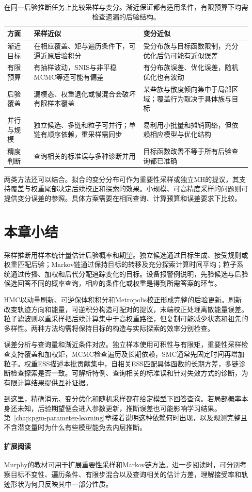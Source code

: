 \begin{table}[htbp]
  \centering
  \begin{tabularx}{\linewidth}{@{}lXX@{}}
    \toprule
    方面 & 采样近似 & 变分近似\\
    \midrule
    渐近目标 & 在相应覆盖、矩与遍历条件下，可逼近原后验积分 & 受分布族与目标函数限制，充分优化后仍可能有近似误差\\
    有限预算 & 有抽样波动，SNIS与非平稳MCMC等还可能有偏差 & 有分布族误差、优化误差，随机优化也有波动\\
    后验覆盖 & 漏模态、权重退化或慢混合会破坏有限样本覆盖 & 某些族与散度倾向集中于局部区域；覆盖行为取决于具体族与目标\\
    并行与规模 & 独立候选、多链和粒子可并行；单链有顺序依赖，重采样需同步 & 易利用小批量和摊销网络，但依赖相应模型与优化结构\\
    精度判断 & 查询相关的标准误与多种诊断并用 & 目标函数改善不等于所有后验查询都已准确\\
    \bottomrule
  \end{tabularx}
  \caption{在同一后验推断任务上比较采样与变分。渐近保证都有适用条件，有限预算下均需检查遗漏的后验结构。}
  \label{tab:pgm-sampling-vi-comparison}
\end{table}

两类方法还可以结合。拟合的变分分布可作为重要性采样或独立MH的提议，其支持覆盖与权重尾部决定后续校正和探索的效果。小规模、可高精度采样的问题则可提供变分误差的参照。具体方案需要在相同查询、计算预算和误差要求下比较。

\section{本章小结}
\label{sec:pgm-sampling-summary}

采样推断用样本统计量估计后验概率和期望。独立候选通过目标生成、接受规则或权重匹配后验；Markov链通过保持目标的转移及充分探索计算时间平均；粒子系统通过传播、加权和后代分配追踪变化的目标。设备报警例说明，先验候选与后验候选回答不同的概率查询，相应的条件化或权重是得到所需答案的环节。

HMC以动量刷新、可逆保体积积分和Metropolis校正形成完整的后验更新。刷新改变轨迹方向和能量，可逆积分构造可配对的提议，末端校正处理离散能量误差。粒子滤波则以重采样把后续计算集中于高权重路径，但复制可能减少状态和祖先的多样性。两种方法均需将保持目标的构造与实际探索的效率分别检查。

误差分析与查询量和渐近条件对应。独立样本使用可积性与有限矩，重要性采样检查支持覆盖和加权矩，MCMC检查遍历及长期依赖，SMC通常先固定时间再增加粒子。权重ESS描述本批贡献集中，自相关ESS匹配具体函数的长期方差，多链诊断检查探索是否一致。可解析特例、查询相关的标准误和针对失效方式的诊断，为有限计算结果提供互补证据。

到这里，精确消元、变分优化和随机采样都在给定模型下回答查询。若局部概率本身还未知，后验期望便会进入参数更新，推断误差也可能影响学习结果。第~\ref{chap:pgm-parameter-learning}章接着说明这种依赖何时出现，以及观测完整且不含潜变量时为什么有些模型能免去内层推断。

\paragraph{扩展阅读}
Murphy的教材可用于扩展重要性采样和Markov链方法。进一步阅读时，可分别考察目标不变性、遍历条件、有限步混合以及查询相关的估计方差，理解接受率和轨迹形状为何只反映其中一部分性质。
